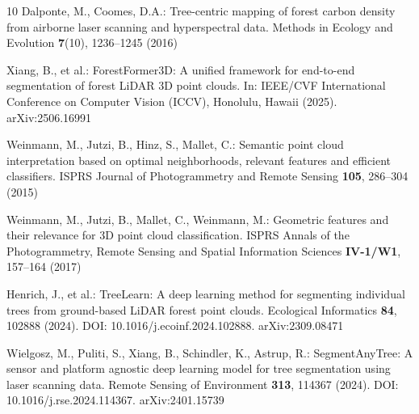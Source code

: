 \documentclass[runningheads]{llncs}
\begin{document}
\begin{thebibliography}{10}
Dalponte, M., Coomes, D.A.:
Tree-centric mapping of forest carbon density from airborne laser scanning and hyperspectral data.
Methods in Ecology and Evolution \textbf{7}(10), 1236--1245 (2016)

Xiang, B., et al.:
ForestFormer3D: A unified framework for end-to-end segmentation of forest LiDAR 3D point clouds.
In: IEEE/CVF International Conference on Computer Vision (ICCV), Honolulu, Hawaii (2025).
arXiv:2506.16991

Weinmann, M., Jutzi, B., Hinz, S., Mallet, C.:
Semantic point cloud interpretation based on optimal neighborhoods, relevant features and efficient classifiers.
ISPRS Journal of Photogrammetry and Remote Sensing \textbf{105}, 286--304 (2015)

Weinmann, M., Jutzi, B., Mallet, C., Weinmann, M.:
Geometric features and their relevance for 3D point cloud classification.
ISPRS Annals of the Photogrammetry, Remote Sensing and Spatial Information Sciences \textbf{IV-1/W1}, 157--164 (2017)


Henrich, J., et al.:
TreeLearn: A deep learning method for segmenting individual trees from ground-based LiDAR forest point clouds.
Ecological Informatics \textbf{84}, 102888 (2024).
DOI: 10.1016/j.ecoinf.2024.102888. arXiv:2309.08471

Wielgosz, M., Puliti, S., Xiang, B., Schindler, K., Astrup, R.:
SegmentAnyTree: A sensor and platform agnostic deep learning model for tree segmentation using laser scanning data.
Remote Sensing of Environment \textbf{313}, 114367 (2024).
DOI: 10.1016/j.rse.2024.114367. arXiv:2401.15739


\end{thebibliography}
\end{document}
